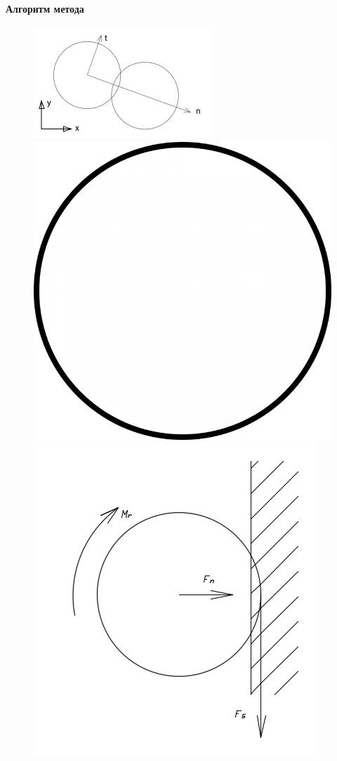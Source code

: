 \documentclass[c]{beamer}  %
\begin{document}
\begin{frame}
\frametitle{\insertsection} 
\framesubtitle{Алгоритм метода}

\begin{figure}[h!]
	\centering
	\vspace*{-2cm}
	\includegraphics[width=0.4\textheight]{local}
	\includegraphics[width=0.2\textheight]{ball_simple}
	\includegraphics[width=0.4\textheight]{ball_wall}
\end{figure} 
\end{frame}
\end{document}
